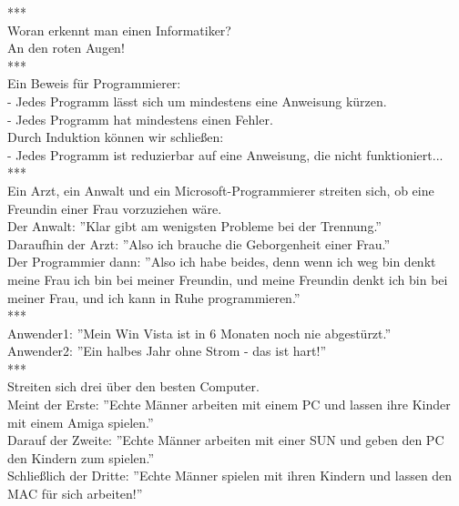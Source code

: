 ***\\


Woran erkennt man einen Informatiker? \\
An den roten Augen!\\


***\\


Ein Beweis für Programmierer:\\
- Jedes Programm lässt sich um mindestens eine Anweisung kürzen.\\
- Jedes Programm hat mindestens einen Fehler.\\
\newline
Durch Induktion können wir schließen:\\
- Jedes Programm ist reduzierbar auf eine Anweisung, die nicht funktioniert...\\


***\\


Ein Arzt, ein Anwalt und ein Microsoft-Programmierer streiten sich, ob eine Freundin einer Frau vorzuziehen wäre. \\
\newline
Der Anwalt: ''Klar gibt am wenigsten Probleme bei der Trennung.'' \\
\newline
Daraufhin der Arzt: ''Also ich brauche die Geborgenheit einer Frau.'' \\
\newline
Der Programmier dann: ''Also ich habe beides, denn wenn ich weg bin denkt meine Frau ich bin bei meiner Freundin, und meine Freundin denkt ich bin bei meiner Frau, und ich kann in Ruhe programmieren.''\\


***\\


Anwender1: ''Mein Win Vista ist in 6 Monaten noch nie abgestürzt.''\\
\newline
Anwender2: ''Ein halbes Jahr ohne Strom - das ist hart!''\\


***\\


Streiten sich drei über den besten Computer.\\
\newline
Meint der Erste: ''Echte Männer arbeiten mit einem PC und lassen ihre Kinder mit einem Amiga spielen.''\\
\newline
Darauf der Zweite: ''Echte Männer arbeiten mit einer SUN und geben den PC den Kindern zum spielen.''\\
\newline
Schließlich der Dritte: ''Echte Männer spielen mit ihren Kindern und lassen den MAC für sich arbeiten!''\\


